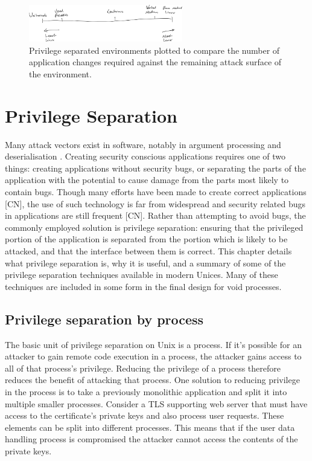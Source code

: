 \documentclass[12pt,a4paper,twoside]{report}
\begin{document}
\begin{figure}[h]
    \centering
    \includegraphics[width=0.6\textwidth]{figures/least-most-linux.png}
    \caption{Privilege separated environments plotted to compare the number of application changes required against the remaining attack surface of the environment.}
    \label{fig:attack-vs-changes}
\end{figure}


\chapter{Privilege Separation}
\label{chap:priv-sep}

Many attack vectors exist in software, notably in argument processing and deserialisation \citep{the_mitre_corporation_deserialization_2006,the_mitre_corporation_improper_2006}. Creating security conscious applications requires one of two things: creating applications without security bugs, or separating the parts of the application with the potential to cause damage from the parts most likely to contain bugs. Though many efforts have been made to create correct applications [CN], the use of such technology is far from widespread and security related bugs in applications are still frequent [CN]. Rather than attempting to avoid bugs, the commonly employed solution is privilege separation: ensuring that the privileged portion of the application is separated from the portion which is likely to be attacked, and that the interface between them is correct. This chapter details what privilege separation is, why it is useful, and a summary of some of the privilege separation techniques available in modern Unices. Many of these techniques are included in some form in the final design for void processes.

\section{Privilege separation by process}
\label{sec:priv-sep-process}

The basic unit of privilege separation on Unix is a process. If it's possible for an attacker to gain remote code execution in a process, the attacker gains access to all of that process's privilege. Reducing the privilege of a process therefore reduces the benefit of attacking that process. One solution to reducing privilege in the process is to take a previously monolithic application and split it into multiple smaller processes. Consider a TLS supporting web server that must have access to the certificate's private keys and also process user requests. These elements can be split into different processes. This means that if the user data handling process is compromised the attacker cannot access the contents of the private keys.
\end{document}
